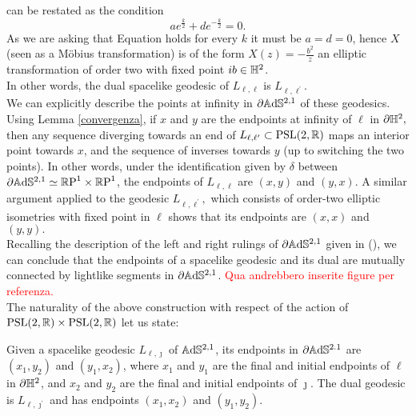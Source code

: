 can be restated as the condition \begin{equation}\label{ellittichine} 
    ae^{\frac{k}{2}}+de^{-\frac{k}{2}}=0.
\end{equation}
As we are asking that Equation  holds for every $k$ it must be $a=d=0$, hence $X$ (seen as a Möbius transformation) is of the form $X(z)=-\frac{b^2}{z}$ an elliptic transformation of order two with fixed point $ib\in \mathbb{H}^2$.\\
In other words, the dual spacelike geodesic of $L_{\ell,\ell}$ is $L_{\ell,\ell^{\prime}}.$\\
We can explicitly describe the points at infinity in $\partial\mathbb{A}\mathrm{d}\mathbb{S}^{2,1}$ of these geodesics. Using Lemma \ref{convergenza}, if $x$ and $y$ are the endpoints at infinity of $\ell$ in $\partial\mathbb{H}^2,$ then any sequence diverging towards an end of $L_{\ell,\ell^{\prime}}\subset \text{PSL}(2,\mathbb{R})$ maps an interior point towards $x$, and the sequence of inverses towards $y$ (up to switching the two points). In other words, under the identification given by $\delta$ between $\partial\mathbb{A}\mathrm{d}\mathbb{S}^{2,1}\simeq\mathbb{R}\text{P}^1\times\mathbb{R}\text{P}^1$, the endpoints of $L_{\ell,\ell}$ are $(x,y)$ and $(y,x)$. A similar argument applied to the geodesic $L_{\ell,\ell^{\prime} },$ which consists of order-two elliptic isometries with fixed point in $\ell$ shows that its endpoints are $(x,x)$ and $(y,y).$\\
Recalling the description of the left and right rulings of $\partial\mathbb{A}\mathrm{d}\mathbb{S}^{2,1}$ given in (), we can conclude that the endpoints of a spacelike geodesic and its dual are mutually connected by lightlike segments in $\partial\mathbb{A}\mathrm{d}\mathbb{S}^{2,1}$. \textcolor{red}{Qua andrebbero inserite figure per referenza.}\\
The naturality of the above construction with respect of the action of $\text{PSL}(2,\mathbb{R})\times\text{PSL}(2,\mathbb{R})$ let us state: 
\begin{proposition}\label{355}
    Given a spacelike geodesic $L_{\ell,\jmath}$ of $\mathbb{A}\mathrm{d}\mathbb{S}^{2,1}$, its endpoints in $\partial \mathbb{A}\mathrm{d}\mathbb{S}^{2.1}$ are $(x_1,y_2)$ and $(y_1,x_2)$, where $x_1$ and $y_1$ are the final and initial endpoints of $\ell$ in $\partial\mathbb{H}^2$, and $x_2$ and $y_2$ are the final and initial endpoints of $\jmath$. The dual geodesic is $L_{\ell,\jmath^{\prime}}$ and has endpoints $(x_1,x_2)$ and $(y_1,y_2).$
\end{proposition}


